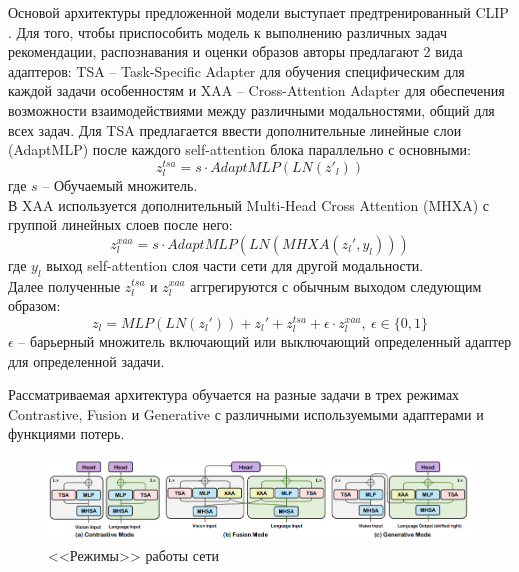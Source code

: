 \documentclass[a4paper,14pt]{extarticle}
\begin{document}
				Основой архитектуры предложенной модели выступает предтренированный CLIP \cite{https://doi.org/10.48550/arXiv.2103.00020}. Для того, чтобы приспособить модель к выполнению различных задач рекомендации, распознавания и оценки образов авторы предлагают 2 вида адаптеров: TSA -- Task-Specific Adapter для обучения специфическим для каждой задачи особенностям и XAA -- Cross-Attention Adapter для обеспечения возможности взаимодействиями между различными модальностями, общий для всех задач. Для TSA предлагается ввести дополнительные линейные слои (AdaptMLP) после каждого self-attention блока параллельно с основными:
				$$z_l^{tsa}=s \cdot AdaptMLP(LN(z'_l))$$
				где $s$ -- Обучаемый множитель.\\
				В XAA используется дополнительный Multi-Head Cross Attention (MHXA) с группой линейных слоев после него:
				$$z_l^{xaa} = s\cdot AdaptMLP(LN(MHXA(z_l',y_l)))$$
				где $y_l$ выход self-attention слоя части сети для другой модальности.\\
				Далее полученные $z_l^{tsa}$ и $z_l^{xaa}$ аггрегируются с обычным выходом следующим образом:
				$$z_l = MLP(LN(z_l')) + z_l'+z_l^{tsa}+\epsilon\cdot z_l^{xaa},~\epsilon\in\{0,1\}$$
				$\epsilon$ -- барьерный множитель включающий или выключающий определенный адаптер для определенной задачи. 
				
				Рассматриваемая архитектура обучается на разные задачи в трех режимах Contrastive, Fusion и Generative с различными используемыми адаптерами и функциями потерь. 
				
				\begin{figure}[h!]
					\includegraphics[scale = 0.7]{pictures/FAME-ViL_modes.png}
					\caption{<<Режимы>> работы сети}
				\end{figure}
			
\end{document}

